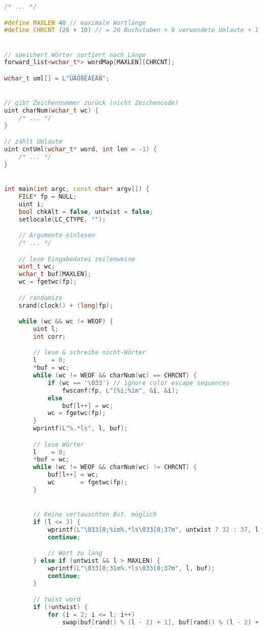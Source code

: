 \documentclass[a4paper,10pt,ngerman]{scrartcl}
\begin{document}
\begin{lstlisting}[language=C++]
/* ... */

#define MAXLEN 40 // maximale Wortlänge
#define CHRCNT (26 + 10) // = 26 Buchstaben + 9 verwendete Umlaute + 1 für andere Sonderzeichen/Umlaute


// speichert Wörter sortiert nach Länge
forward_list<wchar_t*> wordMap[MAXLEN][CHRCNT];

wchar_t uml[] = L"ÜÄÖßÉÀÊÂÑ";


// gibt Zeichennummer zurück (nicht Zeichencode)
uint charNum(wchar_t wc) {
    /* ... */
}

// zählt Umlaute
uint cntUml(wchar_t* word, int len = -1) {
    /* ... */
}


int main(int argc, const char* argv[]) {
    FILE* fp = NULL;
    uint i;
    bool chkAlt = false, untwist = false;
    setlocale(LC_CTYPE, "");

    // Argumente einlesen
    /* ... */

    // lese Eingabedatei zeilenweise
    wint_t wc;
    wchar_t buf[MAXLEN];
    wc = fgetwc(fp);

    // randomize
    srand(clock() + (long)fp);

    while (wc && wc != WEOF) {
        uint l;
        int corr;

        // lese & schreibe nicht-Wörter
        l    = 0;
        *buf = wc;
        while (wc != WEOF && charNum(wc) == CHRCNT) {
            if (wc == '\033') // ignore color escape sequences
                fwscanf(fp, L"[%i;%im", &i, &i);
            else
                buf[l++] = wc;
            wc = fgetwc(fp);
        }
        wprintf(L"%.*ls", l, buf);

        // lese Wörter
        l    = 0;
        *buf = wc;
        while (wc != WEOF && charNum(wc) != CHRCNT) {
            buf[l++] = wc;
            wc       = fgetwc(fp);
        }


        // Keine vertauschten Bst. möglich
        if (l <= 3) {
            wprintf(L"\033[0;%im%.*ls\033[0;37m", untwist ? 32 : 37, l, buf);
            continue;

            // Wort zu lang
        } else if (untwist && l > MAXLEN) {
            wprintf(L"\033[0;31m%.*ls\033[0;37m", l, buf);
            continue;
        }

        // twist word
        if (!untwist) {
            for (i = 2; i <= l; i++)
                swap(buf[rand() % (l - 2) + 1], buf[rand() % (l - 2) + 1]);


\end{lstlisting}
\end{document}
